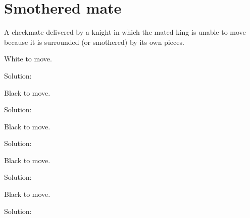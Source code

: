 \documentclass{book}
\begin{document}
\section{Smothered mate}
A checkmate delivered by a knight in which the mated king is unable to move because it is surrounded (or smothered) by its own pieces.\begin{multicols}{2} 
\begin{samepage} 
\newgame 


 
\showboard
 
 White to move. 
 
Solution: 
 
\end{samepage}\begin{samepage} 
\newgame 


 
\showboard
 
 Black to move. 
 
Solution: 
 
\end{samepage}\begin{samepage} 
\newgame 


 
\showboard
 
 Black to move. 
 
Solution: 
 
\end{samepage}\begin{samepage} 
\newgame 


 
\showboard
 
 Black to move. 
 
Solution: 
 
\end{samepage}\begin{samepage} 
\newgame 


 
\showboard
 
 Black to move. 
 
Solution: 
 
\end{samepage}\end{multicols} 
\newpage 
\end{document}
